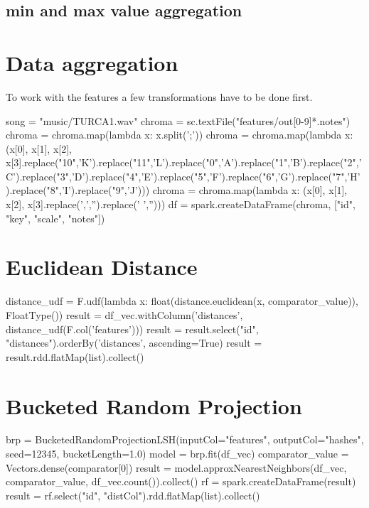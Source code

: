\subsection{min and max value aggregation}

\section{Data aggregation}

To work with the features a few transformations have to be done first. 

\begin{pythonCode}
song = "music/TURCA1.wav"
chroma = sc.textFile("features/out[0-9]*.notes")
chroma = chroma.map(lambda x: x.split(';'))
chroma = chroma.map(lambda x: (x[0], x[1], x[2], x[3].replace("10",'K').replace("11",'L').replace("0",'A').replace("1",'B').replace("2",'C').replace("3",'D').replace("4",'E').replace("5",'F').replace("6",'G').replace("7",'H').replace("8",'I').replace("9",'J')))
chroma = chroma.map(lambda x: (x[0], x[1], x[2], x[3].replace(',','').replace(' ','')))
df = spark.createDataFrame(chroma, ["id", "key", "scale", "notes"])
\end{pythonCode}

\section{Euclidean Distance}

\begin{pythonCode}
distance_udf = F.udf(lambda x: float(distance.euclidean(x, comparator_value)), FloatType())
result = df_vec.withColumn('distances', distance_udf(F.col('features')))
result = result.select("id", "distances").orderBy('distances', ascending=True)
result = result.rdd.flatMap(list).collect()
\end{pythonCode}

\section{Bucketed Random Projection}

\begin{pythonCode}
brp = BucketedRandomProjectionLSH(inputCol="features", outputCol="hashes", seed=12345, bucketLength=1.0)
model = brp.fit(df_vec)
comparator_value = Vectors.dense(comparator[0])
result = model.approxNearestNeighbors(df_vec, comparator_value, df_vec.count()).collect()
rf = spark.createDataFrame(result)
result = rf.select("id", "distCol").rdd.flatMap(list).collect()
\end{pythonCode}



